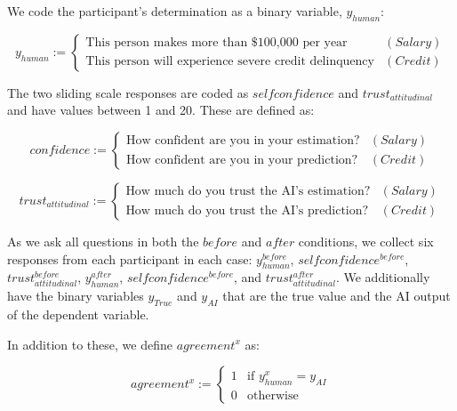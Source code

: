 We code the participant's determination as a binary variable, $y_{human}$:

\begin{equation}
    y_{human} := \begin{cases}
        \text{This person makes more than \$100,000 per year} & (Salary) \\
        \text{This person will experience severe credit delinquency} & (Credit)
    \end{cases}
\end{equation}

\noindent The two sliding scale responses are coded as $selfconfidence$ and $trust_{attitudinal}$ and have values between 1 and 20. These are defined as:

\begin{equation}
    confidence := \begin{cases}
        \text{How confident are you in your estimation?} & (Salary) \\
        \text{How confident are you in your prediction?} & (Credit)
    \end{cases}
\end{equation}

\begin{equation}
    trust_{attitudinal} := \begin{cases}
        \text{How much do you trust the AI's estimation?} & (Salary) \\
        \text{How much do you trust the AI's prediction?} & (Credit)
    \end{cases}
\end{equation}

As we ask all questions in both the $before$ and $after$ conditions, we collect six responses from each participant in each case: $y_{human}^{before}$, $selfconfidence^{before}$, $trust_{attitudinal}^{before}$, $y_{human}^{after}$, $selfconfidence^{before}$, and $trust_{attitudinal}^{after}$.  We additionally have the binary variables $y_{True}$ and $y_{AI}$ that are the true value and the AI output of the dependent variable.

In addition to these, we define $agreement^{x}$ as:

\begin{equation}
    agreement^{x} := \begin{cases}
        1 & \text{if } y_{human}^{x} = y_{AI} \\
        0 & \text{otherwise}
    \end{cases}
\end{equation}

